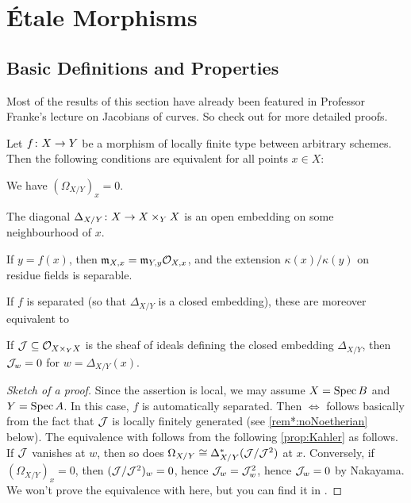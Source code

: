 \section{Étale Morphisms}
\subsection{Basic Definitions and Properties}
Most of the results of this section have already been featured in Professor Franke's lecture on Jacobians of curves. So check out \cite[Section~2.7]{jacobians} for more detailed proofs.
\begin{prop}\label{prop:unramified}
	Let $f\colon X\morphism Y$ be a morphism of locally finite type between arbitrary schemes. Then the following conditions are equivalent for all points $x\in X$:
	\begin{alphanumerate}
		\item We have $(\Omega_{X/Y})_x=0$.
		\item The diagonal $\Delta_{X/Y}\colon X\morphism X\times_YX$ is an open embedding on some neighbourhood of $x$.
		\item If $y=f(x)$, then $\mathfrak{m}_{X,x}=\mathfrak{m}_{Y,y}\mathcal{O}_{X,x}$, and the extension $\kappa(x)/\kappa(y)$ on residue fields is separable.
	\end{alphanumerate}
	If $f$ is separated (so that $\Delta_{X/Y}$ is a closed embedding), these are moreover equivalent to
	\begin{alphanumerate}\setcounter{enumi}{3}
		\item If $\mathcal{J}\subseteq \mathcal{O}_{X\times_YX}$ is the sheaf of ideals defining the closed embedding $\Delta_{X/Y}$, then $\mathcal{J}_w=0$ for $w=\Delta_{X/Y}(x)$.
	\end{alphanumerate}
\end{prop}
\begin{proof}[Sketch of a proof]
	Since the assertion is local, we may assume $X=\operatorname{Spec} B$ and $Y=\operatorname{Spec} A$. In this case, $f$ is automatically separated. Then  $\Leftrightarrow$  follows basically from the fact that $\mathcal{J}$ is locally finitely generated (see \cref{rem*:noNoetherian} below). The equivalence with  follows from the following \cref{prop:Kahler} as follows. If $\mathcal{J}$ vanishes at $w$, then so does $\Omega_{X/Y}\cong \Delta_{X/Y}^*(\mathcal{J}/\mathcal{J}^2)$ at $x$. Conversely, if $(\Omega_{X/Y})_x=0$, then $(\mathcal{J}/\mathcal{J}^2)_w=0$, hence $\mathcal{J}_w=\mathcal{J}_w^2$, hence $\mathcal{J}_w=0$ by Nakayama. We won't prove the equivalence with  here, but you can find it in \cite[Lemma~2.7.2]{jacobians}.
\end{proof}
